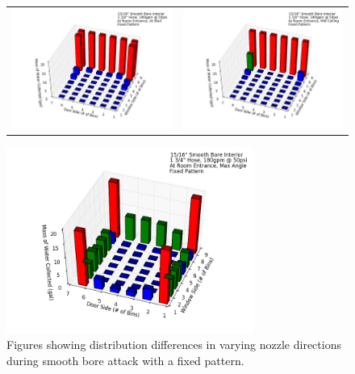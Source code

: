 \documentclass{article}
\begin{document}
\begin{figure}[ht]
\begin{tabular*}{\textwidth}{lr}
\includegraphics[width=3.2in]{../ADD_Analysis/Figures/15-12-09_142948_Datafile_15_16in_Smooth_Bore_Interior.png} &
\includegraphics[width=3.2in]{../ADD_Analysis/Figures/15-12-09_144839_Datafile_15_16in_Smooth_Bore_Interior.png} \\
\end{tabular*}
\centering
\includegraphics[width=3.2in]{../ADD_Analysis/Figures/15-12-09_145932_Datafile_15_16in_Smooth_Bore_Interior.png}
\caption{Figures showing distribution differences in varying nozzle directions during smooth bore attack with a fixed pattern.}
\label{fig:Interior_Varying_Nozzle_Direction_SB_Fixed_Pattern}
\end{figure}
\end{document}
